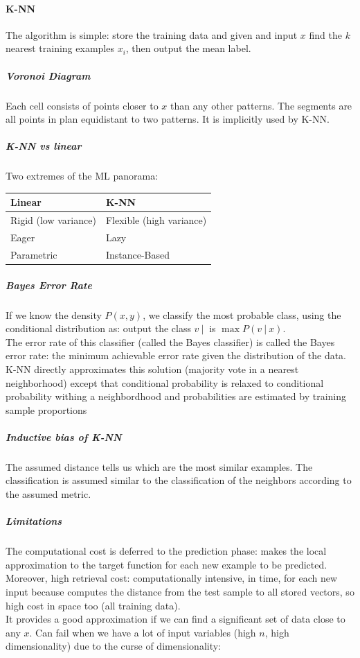 \documentclass[10pt]{report}
\begin{document}
\paragraph{K-NN}
The algorithm is simple: store the training data and given and input $x$ find the $k$ nearest training examples $x_i$, then output the mean label.
\subparagraph{Voronoi Diagram} Each cell consists of points closer to $x$ than any other patterns. The segments are all points in plan equidistant to two patterns. It is implicitly used by K-NN.
\subparagraph{K-NN vs linear} Two extremes of the ML panorama:
\begin{center}
	\begin{tabular}{l | l}
		\textbf{Linear} & \textbf{K-NN}\\
		\hline
		Rigid (low variance) & Flexible (high variance)\\
		Eager & Lazy\\
		Parametric & Instance-Based
	\end{tabular}
\end{center}
\subparagraph{Bayes Error Rate} If we know the density $P(x,y)$, we classify the most probable class, using the conditional distribution as: output the class $v\:|\:$ is $\max P(v\:|\:x)$.\\
The error rate of this classifier (called the Bayes classifier) is called the Bayes error rate: the minimum achievable error rate given the distribution of the data. K-NN directly approximates this solution (majority vote in a nearest neighborhood) except that conditional probability is relaxed to conditional probability withing a neighbordhood and probabilities are estimated by training sample proportions
\subparagraph{Inductive bias of K-NN} The assumed distance tells us which are the most similar examples. The classification is assumed similar to the classification of the neighbors according to the assumed metric.
\subparagraph{Limitations} The computational cost is deferred to the prediction phase: makes the local approximation to the target function for each new example to be predicted.\\
Moreover, high retrieval cost: computationally intensive, in time, for each new input because computes the distance from the test sample to all stored vectors, so high cost in space too (all training data).\\
It provides a good approximation if we can find a significant set of data close to any $x$. Can fail when we have a lot of input variables (high $n$, high dimensionality) due to the curse of dimensionality:
\end{document}
